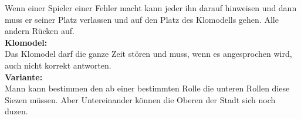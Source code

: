 Wenn einer Spieler einer Fehler macht kann jeder ihn darauf hinweisen und dann muss er seiner Platz verlassen und auf den Platz des Klomodells gehen. Alle andern Rücken auf. \\
\textbf{Klomodel:}\\
Das Klomodel darf die ganze Zeit stören und muss, wenn es angesprochen wird, auch nicht korrekt antworten.\\
\textbf{Variante:}\\
Mann kann bestimmen den ab einer bestimmten Rolle die unteren Rollen diese Siezen müssen. Aber Untereinander können die Oberen der Stadt sich noch duzen.




